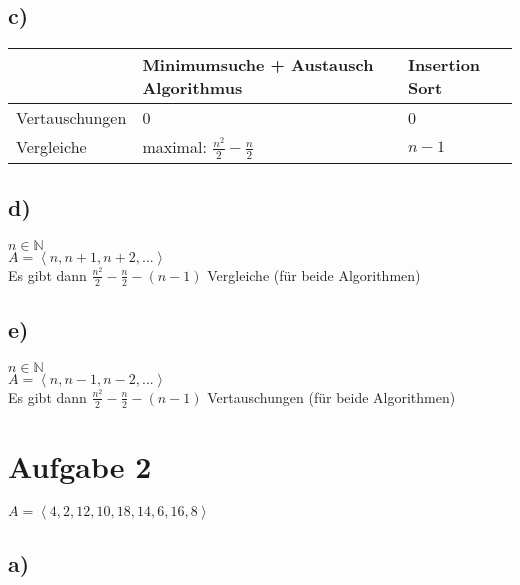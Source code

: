 \documentclass[a4paper]{scrartcl}
\begin{document}
\subsection*{c)}

\begin{tabular}{l|l|l}
               & Minimumsuche + Austausch Algorithmus & Insertion Sort \\
\hline
Vertauschungen & 0                                    & 0               \\
\hline
Vergleiche     & maximal: $\frac{n^2}{2}-\frac{n}{2}$ & $n-1$            \\
                
\end{tabular}

\subsection*{d)}
$n \in \mathbb{N} $ \\
$A = \left\langle n, n+1, n+2, ... \right\rangle$ \\
Es gibt dann $\frac{n^2}{2}-\frac{n}{2}-(n-1)$ Vergleiche (für beide Algorithmen)

\subsection*{e)}
$n \in \mathbb{N} $ \\
$A = \left\langle n, n-1, n-2, ... \right\rangle$ \\
Es gibt dann $\frac{n^2}{2}-\frac{n}{2}-(n-1)$ Vertauschungen (für beide Algorithmen)


\section*{Aufgabe 2}
$A = \left\langle {4,2,12,10,18,14,6,16,8} \right\rangle$
\subsection*{a)}
\end{document}
